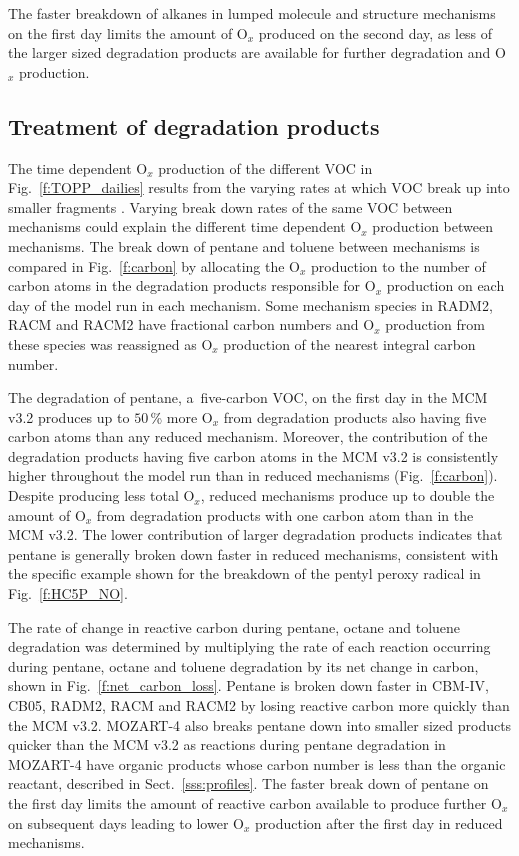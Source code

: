 \documentclass[acpd, online, hvmath]{copernicus}
\begin{document}
The faster breakdown of alkanes in lumped molecule and structure
mechanisms on the first day limits the amount of O$_{x}$ produced
on the second day, as less of the larger sized degradation products
are available for further degradation and O$_{x}$ production.


\subsection{Treatment of degradation products}
\label{ss:products}

The time dependent O$_{x}$ production of the different VOC in
Fig.~\ref{f:TOPP_dailies} results from the varying rates at which VOC
break up into smaller fragments \citep{Butler:2011}.  Varying break
down rates of the same VOC between mechanisms could explain the
different time dependent O$_{x}$ production between mechanisms.
The break down of pentane and toluene between mechanisms is compared
in Fig.~\ref{f:carbon} by allocating the O$_{x}$ production to the
number of carbon atoms in the degradation products responsible for
O$_{x}$ production on each day of the model run in each mechanism.
Some mechanism species in RADM2, RACM and RACM2 have fractional carbon
numbers \citep{Stockwell:1990, Stockwell:1997, Goliff:2013} and
O$_{x}$ production from these species was reassigned as O$_{x}$
production of the nearest integral carbon number.

The degradation of pentane, a~five-carbon VOC, on the first day in the
MCM v3.2 produces up to $50$\,{\%} more O$_{x}$ from degradation
products also having five carbon atoms than any reduced mechanism.
Moreover, the contribution of the degradation products having five
carbon atoms in the MCM v3.2 is consistently higher throughout the
model run than in reduced mechanisms (Fig.~\ref{f:carbon}).  Despite
producing less total O$_{x}$, reduced mechanisms produce up to
double the amount of O$_{x}$ from degradation products with one
carbon atom than in the MCM v3.2.  The lower contribution of larger
degradation products indicates that pentane is generally broken down
faster in reduced mechanisms, consistent with the specific example
shown for the breakdown of the pentyl peroxy radical in
Fig.~\ref{f:HC5P_NO}.

The rate of change in reactive carbon during pentane, octane and
toluene degradation was determined by multiplying the rate of each
reaction occurring during pentane, octane and toluene degradation by
its net change in carbon, shown in Fig.~\ref{f:net_carbon_loss}.
Pentane is broken down faster in CBM-IV, CB05, RADM2, RACM and RACM2
by losing reactive carbon more quickly than the MCM v3.2.  MOZART-4
also breaks pentane down into smaller sized products quicker than the
MCM v3.2 as reactions during pentane degradation in MOZART-4 have
organic products whose carbon number is less than the organic
reactant, described in Sect.~\ref{sss:profiles}.  The faster break
down of pentane on the first day limits the amount of reactive carbon
available to produce further O$_{x}$ on subsequent days leading to
lower O$_{x}$ production after the first day in reduced mechanisms.
\end{document}
